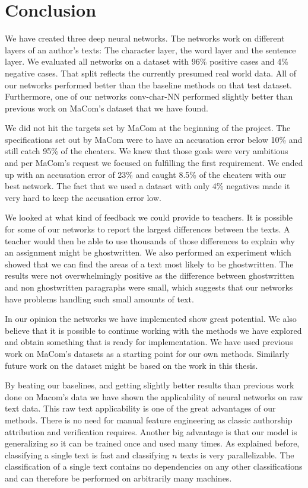 \section{Conclusion} \label{sec:conclusion}

We have created three deep neural networks. The networks work on different
layers of an author's texts: The character layer, the word layer and the
sentence layer. We evaluated all networks on a dataset with 96\% positive cases
and 4\% negative cases. That split reflects the currently presumed real world
data. All of our networks performed better than the baseline methods on that
test dataset. Furthermore, one of our networks \gls{conv-char-NN} performed
slightly better than previous work on MaCom's dataset that we have found.

We did not hit the targets set by MaCom at the beginning of the project. The
specifications set out by MaCom were to have an accusation error below 10\% and
still catch 95\% of the cheaters. We knew that those goals were very ambitious
and per MaCom's request we focused on fulfilling the first requirement. We ended
up with an accusation error of 23\% and caught 8.5\% of the cheaters with our
best network. The fact that we used a dataset with only 4\% negatives made it
very hard to keep the accusation error low.

We looked at what kind of feedback we could provide to teachers. It is possible
for some of our networks to report the largest differences between the texts.
A teacher would then be able to use thousands of those differences to explain
why an assignment might be ghostwritten. We also performed an experiment which
showed that we can find the areas of a text most likely to be ghostwritten. The
results were not overwhelmingly positive as the difference between ghostwritten
and non ghostwritten paragraphs were small, which suggests that our networks
have problems handling such small amounts of text.

In our opinion the networks we have implemented show great potential. We also
believe that it is possible to continue working with the methods we have
explored and obtain something that is ready for implementation. We have used
previous work on MaCom's datasets as a starting point for our own methods.
Similarly future work on the dataset might be based on the work in this thesis.

By beating our baselines, and getting slightly better results than previous work
done on Macom's data we have shown the applicability of neural networks on raw
text data. This raw text applicability is one of the great advantages of our
methods. There is no need for manual feature engineering as classic authorship
attribution and verification requires. Another big advantage is that our model
is generalizing so it can be trained once and used many times. As explained
before, classifying a single text is fast and classifying $n$ texts is very
parallelizable. The classification of a single text contains no dependencies on
any other classifications and can therefore be performed on arbitrarily many
machines.
